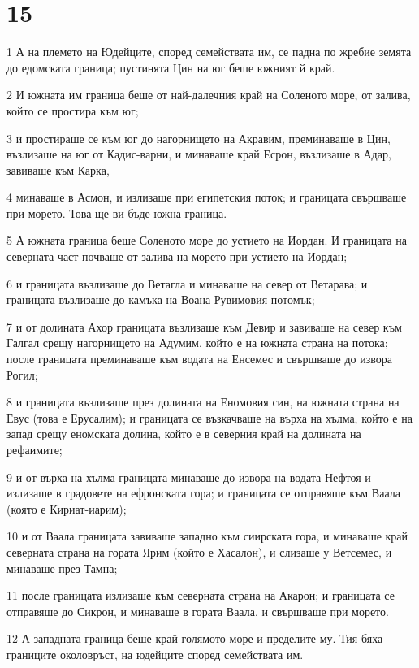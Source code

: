 \chapter{15}

\par 1 А на племето на Юдейците, според семействата им, се падна по жребие земята до едомската граница; пустинята Цин на юг беше южният й край.
\par 2 И южната им граница беше от най-далечния край на Соленото море, от залива, който се простира към юг;
\par 3 и простираше се към юг до нагорнището на Акравим, преминаваше в Цин, възлизаше на юг от Кадис-варни, и минаваше край Есрон, възлизаше в Адар, завиваше към Карка,
\par 4 минаваше в Асмон, и излизаше при египетския поток; и границата свършваше при морето. Това ще ви бъде южна граница.
\par 5 А южната граница беше Соленото море до устието на Иордан. И границата на северната част почваше от залива на морето при устието на Иордан;
\par 6 и границата възлизаше до Ветагла и минаваше на север от Ветарава; и границата възлизаше до камъка на Воана Рувимовия потомък;
\par 7 и от долината Ахор границата възлизаше към Девир и завиваше на север към Галгал срещу нагорнището на Адумим, който е на южната страна на потока; после границата преминаваше към водата на Енсемес и свършваше до извора Рогил;
\par 8 и границата възлизаше през долината на Еномовия син, на южната страна на Евус (това е Ерусалим); и границата се възкачваше на върха на хълма, който е на запад срещу еномската долина, който е в северния край на долината на рефаимите;
\par 9 и от върха на хълма границата минаваше до извора на водата Нефтоя и излизаше в градовете на ефронската гора; и границата се отправяше към Ваала (която е Кириат-иарим);
\par 10 и от Ваала границата завиваше западно към сиирската гора, и минаваше край северната страна на гората Ярим (който е Хасалон), и слизаше у Ветсемес, и минаваше през Тамна;
\par 11 после границата излизаше към северната страна на Акарон; и границата се отправяше до Сикрон, и минаваше в гората Ваала, и свършваше при морето.
\par 12 А западната граница беше край голямото море и пределите му. Тия бяха границите околовръст, на юдейците според семействата им.
